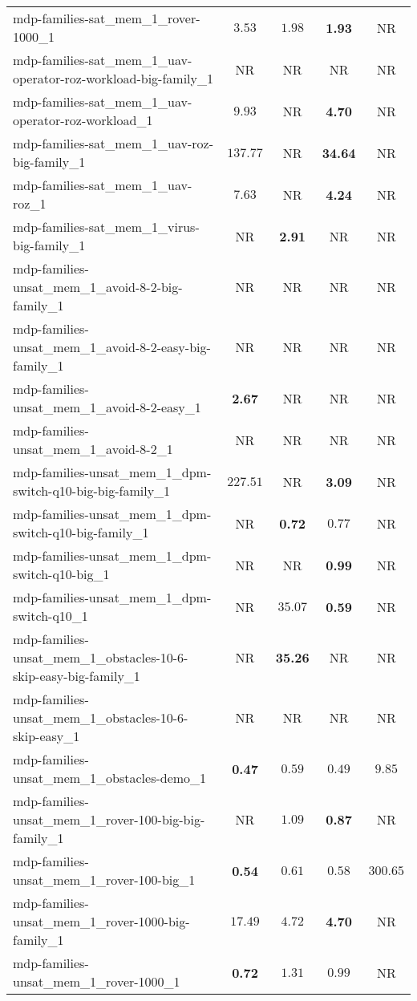 \begin{tabular}{lcccc}
mdp-families-sat\_mem\_1\_rover-1000\_1 & $3.53$ & $1.98$ & \textbf{1.93} & NR \\
mdp-families-sat\_mem\_1\_uav-operator-roz-workload-big-family\_1 & NR & NR & NR & NR \\
mdp-families-sat\_mem\_1\_uav-operator-roz-workload\_1 & $9.93$ & NR & \textbf{4.70} & NR \\
mdp-families-sat\_mem\_1\_uav-roz-big-family\_1 & $137.77$ & NR & \textbf{34.64} & NR \\
mdp-families-sat\_mem\_1\_uav-roz\_1 & $7.63$ & NR & \textbf{4.24} & NR \\
mdp-families-sat\_mem\_1\_virus-big-family\_1 & NR & \textbf{2.91} & NR & NR \\
mdp-families-unsat\_mem\_1\_avoid-8-2-big-family\_1 & NR & NR & NR & NR \\
mdp-families-unsat\_mem\_1\_avoid-8-2-easy-big-family\_1 & NR & NR & NR & NR \\
mdp-families-unsat\_mem\_1\_avoid-8-2-easy\_1 & \textbf{2.67} & NR & NR & NR \\
mdp-families-unsat\_mem\_1\_avoid-8-2\_1 & NR & NR & NR & NR \\
mdp-families-unsat\_mem\_1\_dpm-switch-q10-big-big-family\_1 & $227.51$ & NR & \textbf{3.09} & NR \\
mdp-families-unsat\_mem\_1\_dpm-switch-q10-big-family\_1 & NR & \textbf{0.72} & $0.77$ & NR \\
mdp-families-unsat\_mem\_1\_dpm-switch-q10-big\_1 & NR & NR & \textbf{0.99} & NR \\
mdp-families-unsat\_mem\_1\_dpm-switch-q10\_1 & NR & $35.07$ & \textbf{0.59} & NR \\
mdp-families-unsat\_mem\_1\_obstacles-10-6-skip-easy-big-family\_1 & NR & \textbf{35.26} & NR & NR \\
mdp-families-unsat\_mem\_1\_obstacles-10-6-skip-easy\_1 & NR & NR & NR & NR \\
mdp-families-unsat\_mem\_1\_obstacles-demo\_1 & \textbf{0.47} & $0.59$ & $0.49$ & $9.85$ \\
mdp-families-unsat\_mem\_1\_rover-100-big-big-family\_1 & NR & $1.09$ & \textbf{0.87} & NR \\
mdp-families-unsat\_mem\_1\_rover-100-big\_1 & \textbf{0.54} & $0.61$ & $0.58$ & $300.65$ \\
mdp-families-unsat\_mem\_1\_rover-1000-big-family\_1 & $17.49$ & $4.72$ & \textbf{4.70} & NR \\
mdp-families-unsat\_mem\_1\_rover-1000\_1 & \textbf{0.72} & $1.31$ & $0.99$ & NR \\

\end{tabular}
